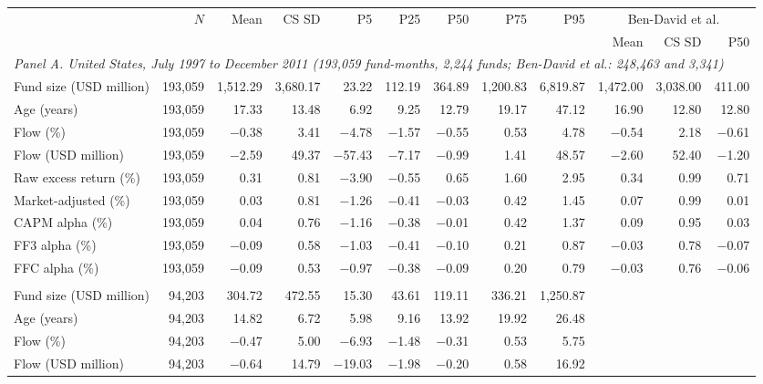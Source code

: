 \begin{tabular}{lrrrrrrrrrrr}
\toprule
 & $N$ & Mean & CS SD & P5 & P25 & P50 & P75 & P95 & \multicolumn{3}{c}{Ben-David et al.} \\
 & & & & & & & & & Mean & CS SD & P50 \\
\midrule
\multicolumn{12}{l}{\textit{Panel A. United States, July 1997 to December 2011 (193,059 fund-months, 2,244 funds; Ben-David et al.: 248,463 and 3,341)}} \\
Fund size (USD million) & 193,059 & 1,512.29 & 3,680.17 & 23.22 & 112.19 & 364.89 & 1,200.83 & 6,819.87 & 1,472.00 & 3,038.00 & 411.00 \\
Age (years) & 193,059 & 17.33 & 13.48 & 6.92 & 9.25 & 12.79 & 19.17 & 47.12 & 16.90 & 12.80 & 12.80 \\
Flow (\%) & 193,059 & $-$0.38 & 3.41 & $-$4.78 & $-$1.57 & $-$0.55 & 0.53 & 4.78 & $-$0.54 & 2.18 & $-$0.61 \\
Flow (USD million) & 193,059 & $-$2.59 & 49.37 & $-$57.43 & $-$7.17 & $-$0.99 & 1.41 & 48.57 & $-$2.60 & 52.40 & $-$1.20 \\
Raw excess return (\%) & 193,059 & 0.31 & 0.81 & $-$3.90 & $-$0.55 & 0.65 & 1.60 & 2.95 & 0.34 & 0.99 & 0.71 \\
Market-adjusted (\%) & 193,059 & 0.03 & 0.81 & $-$1.26 & $-$0.41 & $-$0.03 & 0.42 & 1.45 & 0.07 & 0.99 & 0.01 \\
CAPM alpha (\%) & 193,059 & 0.04 & 0.76 & $-$1.16 & $-$0.38 & $-$0.01 & 0.42 & 1.37 & 0.09 & 0.95 & 0.03 \\
FF3 alpha (\%) & 193,059 & $-$0.09 & 0.58 & $-$1.03 & $-$0.41 & $-$0.10 & 0.21 & 0.87 & $-$0.03 & 0.78 & $-$0.07 \\
FFC alpha (\%) & 193,059 & $-$0.09 & 0.53 & $-$0.97 & $-$0.38 & $-$0.09 & 0.20 & 0.79 & $-$0.03 & 0.76 & $-$0.06 \\
\addlinespace
\multicolumn{12}{l}{\textit{Panel B. Europe, June 2019 to December 2025 (94,203 fund-months, 1,837 funds)}} \\
Fund size (USD million) & 94,203 & 304.72 & 472.55 & 15.30 & 43.61 & 119.11 & 336.21 & 1,250.87 & & & \\
Age (years) & 94,203 & 14.82 & 6.72 & 5.98 & 9.16 & 13.92 & 19.92 & 26.48 & & & \\
Flow (\%) & 94,203 & $-$0.47 & 5.00 & $-$6.93 & $-$1.48 & $-$0.31 & 0.53 & 5.75 & & & \\
Flow (USD million) & 94,203 & $-$0.64 & 14.79 & $-$19.03 & $-$1.98 & $-$0.20 & 0.58 & 16.92 & & & \\

\end{tabular}
